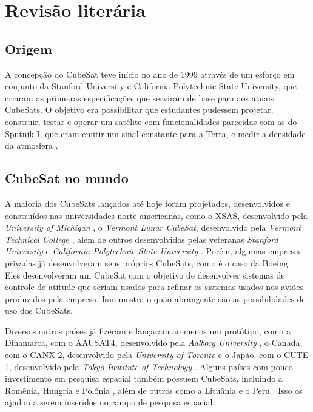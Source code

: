 \documentclass[
	12pt,				%
	openany,			%
	twoside,			%
	a4paper,			%
	english,			%
	french,				%
	spanish,			%
	brazil,				%
	oldfontcommands
	]{abntex2}
\begin{document}
\chapter[Revisão literária]{Revisão literária}



\section[Origem]{Origem}

A concepção do CubeSat teve início no ano de 1999 através de um esforço em conjunto da Stanford University e California Polytechnic State University, que criaram as primeiras especificações que serviram de base para aos atuais CubeSats. O objetivo era possibilitar que estudantes pudessem projetar, construir, testar e operar um satélite com funcionalidades parecidas com as do Sputnik I, que eram emitir um sinal constante para a Terra, e medir a densidade da atmosfera \cite{SmallSat}.

\section[CubeSat no mundo]{CubeSat no mundo} 

A maioria dos CubeSats lançados até hoje foram projetados, desenvolvidos e construídos nas universidades norte-americanas, como o XSAS, desenvolvido pela \textit{University of Michigan} \cite{MCKAY}, o \textit{Vermont Lunar CubeSat}, desenvolvido pela \textit{Vermont Technical College} \cite{Vermont}, além de outros desenvolvidos pelas veteranas \textit{Stanford University} \cite{TWIGGS} e \textit{California Polytechnic State University} \cite{PolySat}. Porém, algumas empresas privadas já desenvolveram seus próprios CubeSats, como é o caso da Boeing \cite{Boeing}. Eles desenvolveram um CubeSat com o objetivo de desenvolver sistemas de controle de atitude que seriam usados para refinar os sistemas usados nos aviões produzidos pela empresa. Isso mostra o quão abrangente são as possibilidades de uso dos CubeSats.

Diversos outros países já fizeram e lançaram ao menos um protótipo, como a Dinamarca, com o AAUSAT4, desenvolvido pela \textit{Aalborg University} \cite{AAUSAT}, o Canada, com o CANX-2, desenvolvido pela \textit{University of Toronto} \cite{CANX} e o Japão, com o CUTE 1, desenvolvido pela \textit{Tokyo Institute of Technology} \cite{CUTE}. Alguns países com pouco investimento em pesquisa espacial também possuem CubeSats, incluindo a Romênia, Hungria e Polônia \cite{ESA}, além de outros como a Lituânia e o Peru \cite{SpaceNews}. Isso os ajudou a serem inseridos no campo de pesquisa espacial.
\end{document}
